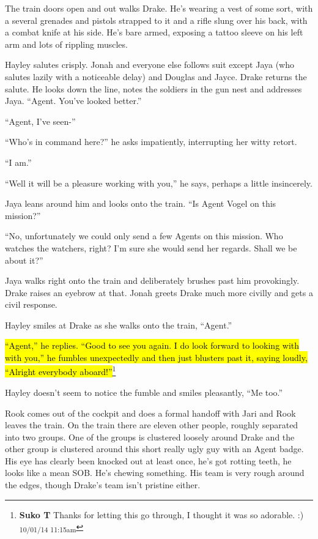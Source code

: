 The train doors open and out walks Drake.  He's wearing a vest of some sort, with a several grenades and pistols strapped to it and a rifle slung over his back, with a combat knife at his side.  He's bare armed, exposing a tattoo sleeve on his left arm and lots of rippling muscles.



Hayley salutes crisply.  Jonah and everyone else follows suit except Jaya (who salutes lazily with a noticeable delay) and Douglas and Jayce.  Drake returns the salute.  He looks down the line, notes the soldiers in the gun nest and addresses Jaya.  ``Agent.  You've looked better.''

``Agent, I've seen-''

``Who's in command here?'' he asks impatiently, interrupting her witty retort.

``I am.''

``Well it will be a pleasure working with you,'' he says, perhaps a little insincerely.

Jaya leans around him and looks onto the train.  ``Is Agent Vogel on this mission?''

``No, unfortunately we could only send a few Agents on this mission.  Who watches the watchers, right?  I'm sure she would send her regards.  Shall we be about it?''

Jaya walks right onto the train and deliberately brushes past him provokingly.  Drake raises an eyebrow at that.  Jonah greets Drake much more civilly and gets a civil response.

Hayley smiles at Drake as she walks onto the train, ``Agent.''

\hl{``Agent,'' he replies.  ``Good to see you again. I do look forward to looking with with you,'' he fumbles unexpectedly and then just blusters past it, saying loudly, ``Alright everybody aboard!''}\footnote{\textbf{Suko T }Thanks for letting this go through, I thought it was so adorable. :) \textsubscript{10/01/14 11:15am}}

Hayley doesn't seem to notice the fumble and smiles pleasantly, ``Me too.''





Rook comes out of the cockpit and does a formal handoff with Jari and Rook leaves the train.  On the train there are eleven other people, roughly separated into two groups.  One of the groups is clustered loosely around Drake and the other group is clustered around this short really ugly guy with an Agent badge.  His eye has clearly been knocked out at least once, he's got rotting teeth, he looks like a mean SOB.   He's chewing something.  His team is very rough around the edges, though Drake's team isn't pristine either.



